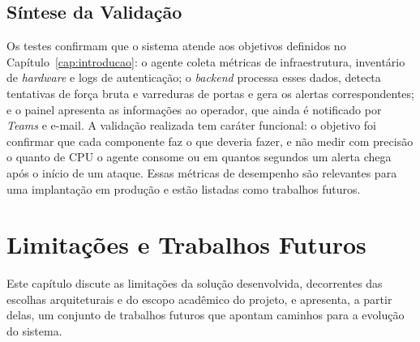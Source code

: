 \documentclass[
    12pt
    ,oneside
    ,a4paper
    ,chapter=TITLE
    ,section=TITLE
    ,sumario=abnt-6027-2012]{abntex2}
\begin{document}
\begin{figure}[H]
\end{figure}

\begin{figure}[H]
\end{figure}

\begin{figure}[H]
\end{figure}

\section{Síntese da Validação}
\label{sec:discussao}

Os testes confirmam que o sistema atende aos objetivos definidos no Capítulo~\ref{cap:introducao}: o agente coleta métricas de infraestrutura, inventário de \textit{hardware} e logs de autenticação; o \textit{backend} processa esses dados, detecta tentativas de força bruta e varreduras de portas e gera os alertas correspondentes; e o painel apresenta as informações ao operador, que ainda é notificado por \textit{Teams} e e-mail. A validação realizada tem caráter funcional: o objetivo foi confirmar que cada componente faz o que deveria fazer, e não medir com precisão o quanto de CPU o agente consome ou em quantos segundos um alerta chega após o início de um ataque. Essas métricas de desempenho são relevantes para uma implantação em produção e estão listadas como trabalhos futuros.

\chapter{Limitações e Trabalhos Futuros}
\label{cap:limitacoes}

Este capítulo discute as limitações da solução desenvolvida, decorrentes das escolhas arquiteturais e do escopo acadêmico do projeto, e apresenta, a partir delas, um conjunto de trabalhos futuros que apontam caminhos para a evolução do sistema.
\end{document}
